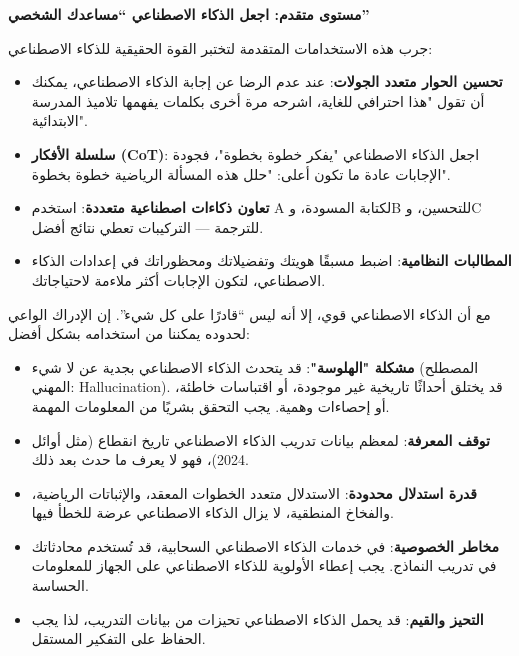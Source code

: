 \textbf{مستوى متقدم: اجعل الذكاء الاصطناعي “مساعدك الشخصي”}\par

جرب هذه الاستخدامات المتقدمة لتختبر القوة الحقيقية للذكاء الاصطناعي:

\begin{itemize}
  \item \textbf{تحسين الحوار متعدد الجولات}: عند عدم الرضا عن إجابة الذكاء الاصطناعي، يمكنك أن تقول "هذا احترافي للغاية، اشرحه مرة أخرى بكلمات يفهمها تلاميذ المدرسة الابتدائية".
  \item \textbf{سلسلة الأفكار (CoT)}: اجعل الذكاء الاصطناعي "يفكر خطوة بخطوة"، فجودة الإجابات عادة ما تكون أعلى: "حلل هذه المسألة الرياضية خطوة بخطوة".
  \item \textbf{تعاون ذكاءات اصطناعية متعددة}: استخدم A لكتابة المسودة، وB للتحسين، وC للترجمة — التركيبات تعطي نتائج أفضل.
  \item \textbf{المطالبات النظامية}: اضبط مسبقًا هويتك وتفضيلاتك ومحظوراتك في إعدادات الذكاء الاصطناعي، لتكون الإجابات أكثر ملاءمة لاحتياجاتك.
\end{itemize}


مع أن الذكاء الاصطناعي قوي، إلا أنه ليس “قادرًا على كل شيء”. إن الإدراك الواعي لحدوده يمكننا من استخدامه بشكل أفضل:

\begin{itemize}
  \item \textbf{مشكلة "الهلوسة"}: قد يتحدث الذكاء الاصطناعي بجدية عن لا شيء (المصطلح المهني: Hallucination). قد يختلق أحداثًا تاريخية غير موجودة، أو اقتباسات خاطئة، أو إحصاءات وهمية. يجب التحقق بشريًا من المعلومات المهمة.
  \item \textbf{توقف المعرفة}: لمعظم بيانات تدريب الذكاء الاصطناعي تاريخ انقطاع (مثل أوائل 2024)، فهو لا يعرف ما حدث بعد ذلك.
  \item \textbf{قدرة استدلال محدودة}: الاستدلال متعدد الخطوات المعقد، والإثباتات الرياضية، والفخاخ المنطقية، لا يزال الذكاء الاصطناعي عرضة للخطأ فيها.
  \item \textbf{مخاطر الخصوصية}: في خدمات الذكاء الاصطناعي السحابية، قد تُستخدم محادثاتك في تدريب النماذج. يجب إعطاء الأولوية للذكاء الاصطناعي على الجهاز للمعلومات الحساسة.
  \item \textbf{التحيز والقيم}: قد يحمل الذكاء الاصطناعي تحيزات من بيانات التدريب، لذا يجب الحفاظ على التفكير المستقل.
\end{itemize}

